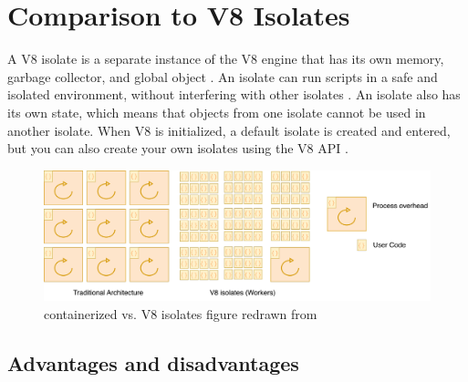 \section{Comparison to V8 Isolates}
\label{sec:v8-comparison}
A V8 isolate is a separate instance of the V8 engine that has its own memory, garbage collector, and global object \cite{a2021_isolate}. An isolate can run scripts in a safe and isolated environment, without interfering with other isolates \cite{cloudflareinc_2023_how}. An isolate also has its own state, which means that objects from one isolate cannot be used in another isolate. When V8 is initialized, a default isolate is created and entered, but you can also create your own isolates using the V8 API \cite{a2021_isolate}.

\begin{figure}[H]
	\centering
		\includegraphics[width=\textwidth,height=\textheight,keepaspectratio]{images/runtimes/v8-isolates.pdf}
	\caption{containerized vs. \gls{V8} \glspl{isolate} figure redrawn from \cite{cloudflareinc_2023_how}}
	\label{fig:v8-isolates}
\end{figure}

\subsection{Advantages and disadvantages}
\label{sec:advantages-disadvantages}